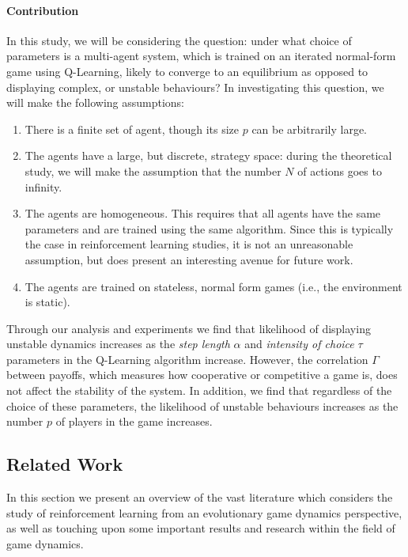 \documentclass[sigconf,anonymous]{aamas}
\begin{document}
\paragraph{Contribution}
In this study, we will be considering the question: under what choice
of parameters is a multi-agent system, which is trained on an iterated normal-form game using Q-Learning, likely to converge to an equilibrium as opposed
to displaying complex, or unstable behaviours? In investigating this
question, we will make the following assumptions:

\begin{enumerate}
    \item There is a finite set of agent, though its size $p$ can be
      arbitrarily large.
      
    \item The agents have a large, but discrete, strategy space:
      during the theoretical study, we will make the assumption that
      the number $N$ of actions goes to infinity.

  \item The agents are homogeneous. This requires that all agents have
    the same parameters and are trained using the same
    algorithm. Since this is typically the case in reinforcement
    learning studies, it is not an unreasonable assumption, but does
    present an interesting avenue for future work.

  \item The agents are trained on stateless, normal form games
    (i.e., the environment is static).
\end{enumerate}

Through our analysis and experiments we find that likelihood of
displaying unstable dynamics increases as the \textit{step length}
$\alpha$ and \textit{intensity of choice} $\tau$ parameters in the
Q-Learning algorithm
increase. However, the
correlation $\Gamma$ between payoffs, which measures how cooperative
or competitive a game is, does not affect the stability of the
system. In addition, we find that regardless of the choice of these
parameters, the likelihood of unstable behaviours increases as the
number  $p$ of players in the game increases.

\subsection{Related Work}

In this section we present an overview of the vast literature which
considers the study of reinforcement learning from an evolutionary
game dynamics perspective, as well as touching upon some important
results and research within the field of game dynamics.
\end{document}
